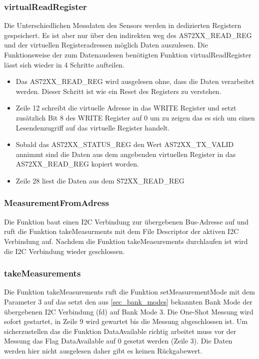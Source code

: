 \subsubsection{virtualReadRegister}
Die Unterschiedlichen Messdaten des Sensors werden in dedizierten Registern gespeichert.
 Es ist aber nur über den indirekten weg des AS72XX\_READ\_REG und der virtuellen Registeradressen möglich Daten auszulesen.
Die Funktionsweise der zum Datenauslesen benötigten Funktion virtualReadRegister lässt sich wieder in 4 Schritte aufteilen.
\begin{itemize}
	\item Das AS72XX\_READ\_REG wird ausgelesen ohne, dass die Daten verarbeitet werden. Dieser Schritt ist wie ein Reset des Registers zu verstehen.
	\item Zeile 12 schreibt die virtuelle Adresse in das WRITE Register und setzt zusätzlich Bit 8 des WRITE Register auf 0 um zu zeigen das es sich um einen Lesendenzugriff auf das virtuelle Register handelt.
	\item Sobald das AS72XX\_STATUS\_REG den Wert AS72XX\_TX\_VALID annimmt sind die Daten aus dem angebenden virtuellen Register in das AS72XX\_READ\_REG kopiert worden.
	\item Zeile 28 liest die Daten aus dem S72XX\_READ\_REG
\end{itemize}


\subsubsection{MeasurementFromAdress}
Die Funktion baut einen I2C Verbindung zur übergebenen Bus-Adresse auf und  ruft die Funktion takeMeasurments mit dem File Descriptor der aktiven I2C Verbindung auf.
Nachdem die Funktion takeMeasurements durchlaufen ist wird die I2C Verbindung wieder geschlossen.


\subsubsection{takeMeasurements}

Die Funktion takeMeasurements ruft die Funktion setMeasurementMode mit dem Parameter 3 auf das setzt den aus \ref{sec_bank_modes} bekannten Bank Mode der übergebenen I2C Verbindung (fd) auf Bank Mode 3.
	Die One-Shot Messung wird sofort gestartet, in Zeile 9 wird gewartet bis die Messung abgeschlossen ist. 
		Um sicherzustellen das die Funktion DataAvailable richtig arbeitet muss vor der Messung das Flag DataAvailable auf 0 gesetzt werden (Zeile 3).
Die Daten werden hier nicht ausgelesen daher gibt es keinen Rückgabewert.\\


